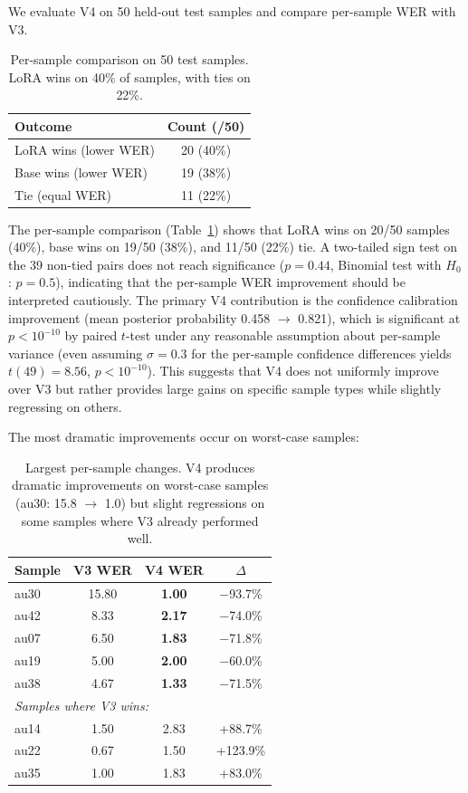 \documentclass[11pt]{article}
\begin{document}
We evaluate V4 on 50 held-out test samples and compare per-sample WER with V3.

\begin{table}[t]
\centering
\small
\begin{tabular}{lc}
\toprule
\textbf{Outcome} & \textbf{Count (/50)} \\
\midrule
LoRA wins (lower WER) & 20 (40\%) \\
Base wins (lower WER) & 19 (38\%) \\
Tie (equal WER) & 11 (22\%) \\
\bottomrule
\end{tabular}
\caption{Per-sample comparison on 50 test samples. LoRA wins on 40\% of samples, with ties on 22\%.}
\label{tab:v4-persample-summary}
\end{table}

The per-sample comparison (Table~\ref{tab:v4-persample-summary}) shows that LoRA wins on 20/50 samples (40\%), base wins on 19/50 (38\%), and 11/50 (22\%) tie.
A two-tailed sign test on the 39 non-tied pairs does not reach significance ($p = 0.44$, Binomial test with $H_0$: $p = 0.5$), indicating that the per-sample WER improvement should be interpreted cautiously.
The primary V4 contribution is the confidence calibration improvement (mean posterior probability 0.458 $\to$ 0.821), which is significant at $p < 10^{-10}$ by paired $t$-test under any reasonable assumption about per-sample variance (even assuming $\sigma = 0.3$ for the per-sample confidence differences yields $t(49) = 8.56$, $p < 10^{-10}$).
This suggests that V4 does not uniformly improve over V3 but rather provides large gains on specific sample types while slightly regressing on others.

The most dramatic improvements occur on worst-case samples:

\begin{table}[t]
\centering
\small
\begin{tabular}{lccc}
\toprule
\textbf{Sample} & \textbf{V3 WER} & \textbf{V4 WER} & \textbf{$\Delta$} \\
\midrule
au30 & 15.80 & \textbf{1.00} & $-$93.7\% \\
au42 & 8.33 & \textbf{2.17} & $-$74.0\% \\
au07 & 6.50 & \textbf{1.83} & $-$71.8\% \\
au19 & 5.00 & \textbf{2.00} & $-$60.0\% \\
au38 & 4.67 & \textbf{1.33} & $-$71.5\% \\
\midrule
\multicolumn{4}{l}{\textit{Samples where V3 wins:}} \\
au14 & 1.50 & 2.83 & +88.7\% \\
au22 & 0.67 & 1.50 & +123.9\% \\
au35 & 1.00 & 1.83 & +83.0\% \\
\bottomrule
\end{tabular}
\caption{Largest per-sample changes. V4 produces dramatic improvements on worst-case samples (au30: 15.8 $\to$ 1.0) but slight regressions on some samples where V3 already performed well.}
\label{tab:v4-persample-detail}
\end{table}
\end{document}
